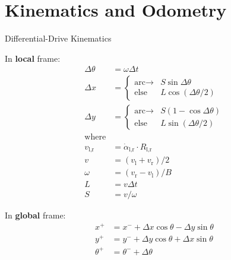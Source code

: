 \documentclass{beamer}
\begin{document}
\section{Kinematics and Odometry}


\begin{frame}{Differential-Drive Kinematics}
  
  \begin{minipage}{0.5\columnwidth}
    In \textbf{local} frame:
    \vspace{-0.5\baselineskip}
    \begin{align*}
      \Delta\theta
      &=
      \omega \Delta t
      \\
      \Delta x
      &=
      \begin{cases}
        \text{arc} \rightarrow
        &
        S \sin \Delta \theta
        \\
        \text{else}
        &
        L \cos (\Delta \theta / 2)
      \end{cases}
      \\
      \Delta y
      &=
      \begin{cases}
        \text{arc} \rightarrow
        &
        S (1 - \cos \Delta \theta)
        \\
        \text{else}
        &
        L \sin (\Delta \theta / 2)
      \end{cases}
      \\
      \text{where}
      \\
      v_\text{l,r}
      &=
      \dot\alpha_\text{l,r} \cdot R_\text{l,r}
      \\
      v
      &=
      (v_\text{l} + v_\text{r}) / 2
      \\
      \omega
      &=
      (v_\text{r} - v_\text{l}) / B
      \\
      L
      &=
      v \Delta t
      \\
      S
      &=
      v / \omega
    \end{align*}
    
  \end{minipage}%
  \begin{minipage}{0.3\columnwidth}
    
    \def\svgwidth{1.4\columnwidth}
    

    In \textbf{global} frame:
    \vspace{-0.5\baselineskip}
    \begin{align*}
      x^+
      &=
      x^- + \Delta x \cos \theta - \Delta y \sin \theta
      \\
      y^+
      &=
      y^- + \Delta y \cos \theta + \Delta x \sin \theta
      \\
      \theta^+
      &=
      \theta^- + \Delta \theta
    \end{align*}
    
  \end{minipage}
  
\end{frame}
\end{document}
